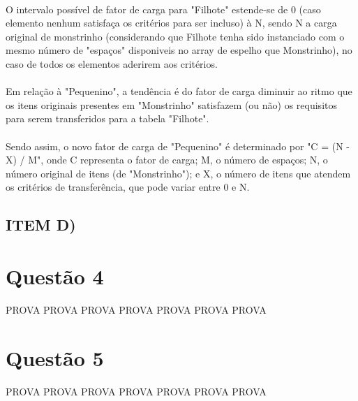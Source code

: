 \documentclass[12pt, letterpaper]{article}
\begin{document}
\paragraph{}
O intervalo possível de fator de carga para "Filhote" estende-se de 0 (caso elemento
nenhum satisfaça os critérios para ser incluso) à N, sendo N a carga original de
monstrinho (considerando que Filhote tenha sido instanciado com o mesmo número de
"espaços" disponiveis no array de espelho que Monstrinho), no caso de todos os elementos
aderirem aos critérios.

\paragraph{}
Em relação à "Pequenino", a tendência é do fator de carga diminuir ao ritmo que os itens
originais presentes em "Monstrinho" satisfazem (ou não) os requisitos para serem
transferidos para a tabela "Filhote".

\paragraph{}
Sendo assim, o novo fator de carga de "Pequenino"
é determinado por "C = (N - X) / M", onde C representa o fator de carga; M, o número de
espaços; N, o número original de itens (de "Monstrinho"); e X, o número de itens que
atendem os critérios de transferência, que pode variar entre 0 e N.

\subsection{ITEM D)}
\paragraph{}

\newpage
\section{Questão 4}
PROVA PROVA PROVA PROVA PROVA PROVA PROVA

\newpage
\section{Questão 5}
PROVA PROVA PROVA PROVA PROVA PROVA PROVA
\end{document}
